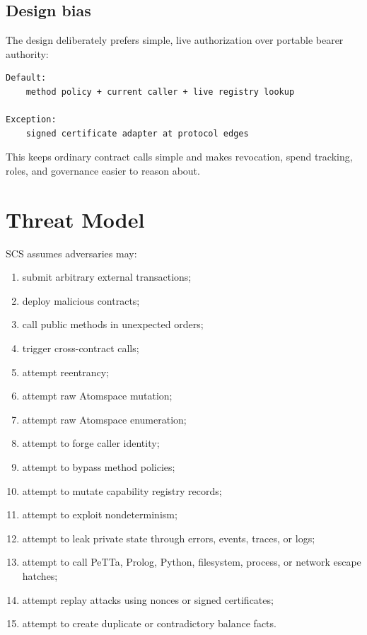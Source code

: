 \documentclass[11pt]{article}
\newcommand{\SCS}{\textsc{SCS}}
\newcommand{\PeTTa}{PeTTa}
\begin{document}
\subsection{Design bias}

The design deliberately prefers simple, live authorization over portable bearer authority:

\begin{lstlisting}
Default:
    method policy + current caller + live registry lookup

Exception:
    signed certificate adapter at protocol edges
\end{lstlisting}

This keeps ordinary contract calls simple and makes revocation, spend tracking, roles, and governance easier to reason about.



\section{Threat Model}

\SCS{} assumes adversaries may:

\begin{enumerate}
  \item submit arbitrary external transactions;
  \item deploy malicious contracts;
  \item call public methods in unexpected orders;
  \item trigger cross-contract calls;
  \item attempt reentrancy;
  \item attempt raw Atomspace mutation;
  \item attempt raw Atomspace enumeration;
  \item attempt to forge caller identity;
  \item attempt to bypass method policies;
  \item attempt to mutate capability registry records;
  \item attempt to exploit nondeterminism;
  \item attempt to leak private state through errors, events, traces, or logs;
  \item attempt to call \PeTTa{}, Prolog, Python, filesystem, process, or network escape hatches;
  \item attempt replay attacks using nonces or signed certificates;
  \item attempt to create duplicate or contradictory balance facts.
\end{enumerate}
\end{document}
